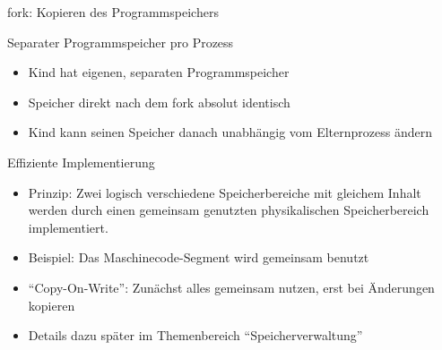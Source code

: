 \documentclass[utf8,9pt]{beamer}
\begin{document}
\begin{frame}{fork: Kopieren des Programmspeichers}{}

  \begin{block}{Separater Programmspeicher pro Prozess}
    \begin{itemize}
    \item Kind hat eigenen, separaten Programmspeicher
    \item Speicher direkt nach dem fork absolut identisch
    \item Kind kann seinen Speicher danach unabhängig vom
      Elternprozess ändern
    \end{itemize}
  \end{block}

  \begin{block}{Effiziente Implementierung}
    \begin{itemize}
    \item Prinzip: Zwei logisch verschiedene Speicherbereiche mit
      gleichem Inhalt werden durch einen gemeinsam genutzten
      physikalischen Speicherbereich implementiert.
    \item Beispiel: Das Maschinecode-Segment wird gemeinsam benutzt
    \item "`Copy-On-Write"': Zunächst alles gemeinsam nutzen, erst bei
      Änderungen kopieren
    \item Details dazu später im Themenbereich "`Speicherverwaltung"'
    \end{itemize}

  \end{block}
\end{frame}
\end{document}
